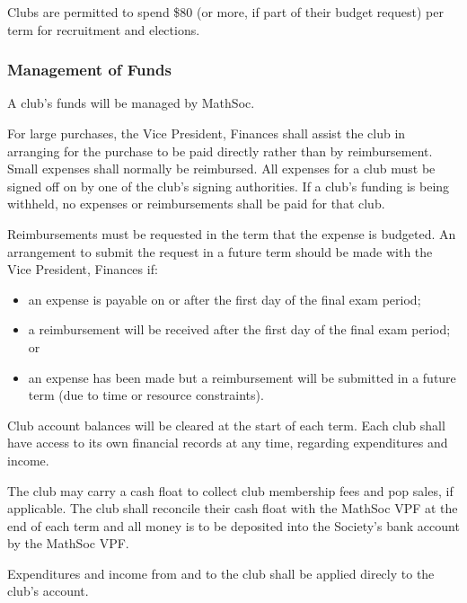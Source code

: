 Clubs are permitted to spend \$80 (or more, if part of their budget request) per
term for recruitment and elections.

\subsubsection{Management of Funds}
A club's funds will be managed by MathSoc.

For large purchases, the Vice President, Finances shall assist the club in
arranging for the purchase to be paid directly rather than by reimbursement.
Small expenses shall normally be reimbursed. All expenses for a club must be
signed off on by one of the club's signing authorities. If a club's funding is
being withheld, no expenses or reimbursements shall be paid for that club.

Reimbursements must be requested in the term that the expense is budgeted. 
An arrangement to submit the request in a future term should be made with
the Vice President, Finances if:
\begin{itemize}
	\item an expense is payable on or after the first day of the final exam period;
	\item a reimbursement will be received after the first day of the final exam period; or
	\item an expense has been made but a reimbursement will be submitted in a 
	future term (due to time or resource constraints).
\end{itemize}

Club account balances will be cleared at the start of each term. Each club shall have access to its own financial records at any time, regarding expenditures and income. 

The club may carry a cash float to collect club membership fees and pop sales, if applicable. 
The club shall reconcile their cash float with the MathSoc VPF at the end of each term and all money is to be deposited into the Society's bank account by the MathSoc VPF. 

Expenditures and income from and to the club shall be applied direcly to the club's account. 